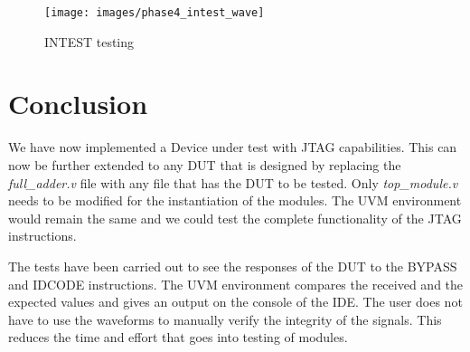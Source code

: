 \documentclass[a4paper,11pt]{article}
\begin{document}
\begin{sidewaysfigure}[ht]
\centering
\texttt{[image: images/phase4\_intest\_wave]}
\caption{INTEST testing}
\label{fig:LandscapeFigure}
\end{sidewaysfigure}
\newpage
\pagebreak
\FloatBarrier

\section{Conclusion}

We have now implemented a Device under test with JTAG capabilities. This can now be further extended to any DUT that is designed by replacing the \textit{full\_adder.v} file with any file that has the DUT to be tested. Only \textit{top\_module.v} needs to be modified for the instantiation of the modules. The UVM environment would remain the same and we could test the complete functionality of the JTAG instructions.

The tests have been carried out to see the responses of the DUT to the BYPASS and IDCODE instructions. The UVM environment compares the received and the expected values and gives an output on the console of the IDE. The user does not have to use the waveforms to manually verify the integrity of the signals. This reduces the time and effort that goes into testing of modules.
\end{document}
